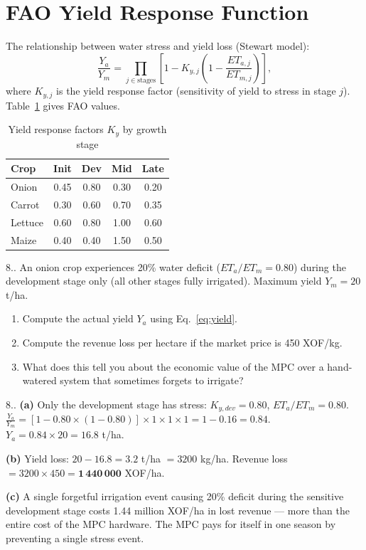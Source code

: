 \documentclass[12pt,a4paper,openany]{book}
\newcounter{exoctr}[chapter]
\renewcommand{\theexoctr}{\thechapter.\arabic{exoctr}}
\begin{document}
\section{FAO Yield Response Function}

The relationship between water stress and yield loss (Stewart model):
\begin{equation}
  \frac{Y_a}{Y_m} = \prod_{j\in\text{stages}}\left[1-K_{y,j}\left(1-\frac{ET_{a,j}}{ET_{m,j}}\right)\right],
  \label{eq:yield}
\end{equation}
where $K_{y,j}$ is the yield response factor (sensitivity of yield to stress in stage $j$). Table~\ref{tab:Ky} gives FAO values.

\begin{table}[H]
\centering
\caption{Yield response factors $K_y$ by growth stage}
\label{tab:Ky}
\renewcommand{\arraystretch}{1.3}
\begin{tabular}{lcccc}
\toprule
\textbf{Crop}&\textbf{Init}&\textbf{Dev}&\textbf{Mid}&\textbf{Late}\\
\midrule
Onion  & 0.45 & 0.80 & 0.30 & 0.20 \\
Carrot & 0.30 & 0.60 & 0.70 & 0.35 \\
Lettuce& 0.60 & 0.80 & 1.00 & 0.60 \\
Maize  & 0.40 & 0.40 & 1.50 & 0.50 \\
\bottomrule
\end{tabular}
\end{table}

\begin{exobox}{8.\theexoctr}
An onion crop experiences 20\% water deficit ($ET_a/ET_m=0.80$) during the development stage only (all other stages fully irrigated). Maximum yield $Y_m=20$ t/ha.
\begin{enumerate}[label=(\alph*)]
  \item Compute the actual yield $Y_a$ using Eq.~\eqref{eq:yield}.
  \item Compute the revenue loss per hectare if the market price is 450 XOF/kg.
  \item What does this tell you about the economic value of the MPC over a hand-watered system that sometimes forgets to irrigate?
\end{enumerate}
\end{exobox}

\begin{solbox}{8.\theexoctr}
\textbf{(a)} Only the development stage has stress: $K_{y,dev}=0.80$, $ET_a/ET_m=0.80$.
$\frac{Y_a}{Y_m}=[1-0.80\times(1-0.80)]\times1\times1\times1=1-0.16=0.84$.
$Y_a=0.84\times20=\mathbf{16.8}$ t/ha.

\textbf{(b)} Yield loss: $20-16.8=3.2$ t/ha $=3200$ kg/ha. Revenue loss $=3200\times450=\mathbf{1\,440\,000}$ XOF/ha.

\textbf{(c)} A single forgetful irrigation event causing 20\% deficit during the sensitive development stage costs 1.44 million XOF/ha in lost revenue — more than the entire cost of the MPC hardware. The MPC pays for itself in one season by preventing a single stress event.
\end{solbox}
\end{document}

